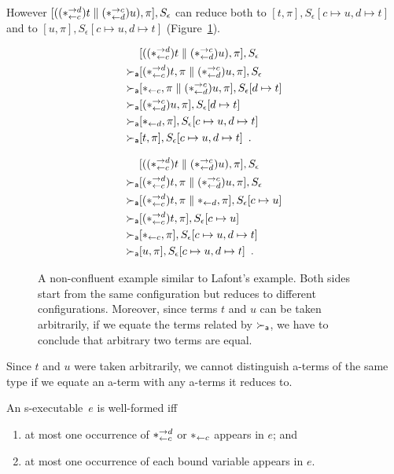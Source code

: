 However $[((\comod c{d})t\conc (\comod{d} c)u),
\pi],S_\epsilon$
can reduce both to $[t,\pi], S_\epsilon[c\mapsto u, d\mapsto t]$
and to $[u,\pi], S_\epsilon[c\mapsto u,d\mapsto t]$ (Figure~\ref{fig:lafont}).
\begin{figure}
 \begin{subfigure}[b]{0.45\textwidth}
  \begin{align*}
   & [((\comodL)t\conc (\comodR) u),\pi], S_\epsilon \\
   \ared & [(\comodL)t,\pi\conc (\comodR)u,\pi], S_\epsilon \\
   \ared & [\reader c, \pi\conc (\comodR)u,\pi], S_\epsilon[d\mapsto
   t] \\
   \ared & [(\comodR)u,\pi], S_\epsilon[d\mapsto t] \\
   \ared & [\reader d, \pi], S_\epsilon[c\mapsto u, d\mapsto t] \\
   \ared & [t,\pi], S_\epsilon[c\mapsto u,d\mapsto t]\enspace.
  \end{align*}
 \end{subfigure}
 \begin{subfigure}[b]{0.45\textwidth}
  \begin{align*}
   & [((\comodL)t\conc (\comodR) u),\pi], S_\epsilon \\
   \ared & [(\comodL)t,\pi\conc (\comodR)u,\pi], S_\epsilon \\
   \ared & [(\comodL)t,\pi\conc \reader d,\pi], S_\epsilon[c\mapsto u] \\
   \ared & [(\comodL)t,\pi], S_\epsilon[c\mapsto u] \\
   \ared & [\reader c,\pi], S_\epsilon[c\mapsto u,d\mapsto t] \\
   \ared & [u,\pi], S_\epsilon[c\mapsto u,d\mapsto t]\enspace.
  \end{align*}
 \end{subfigure}
 \caption[A non-confluent example similar to Lafont's example.]
 {A non-confluent example similar to Lafont's example.  Both sides start
 from the same configuration but reduces to different configurations.
 Moreover, since terms $t$ and $u$ can be taken arbitrarily, if we
 equate the terms related by $\ared$, we have to conclude that arbitrary
 two terms are equal.}
 \label{fig:lafont}
\end{figure}
Since $t$ and $u$ were taken arbitrarily, we cannot distinguish a-terms
of the same type if we equate an a-term with any a-terms it reduces to.

\begin{definition}
 An s-executable~$e$ is well-formed iff
 \begin{enumerate}
  \item \label{well1} at most one occurrence of $\comodL$ or $\reader c$ appears in
	$e$; and
  \item \label{well2} at most one occurrence of each bound variable appears in $e$.
 \end{enumerate}
\end{definition}

